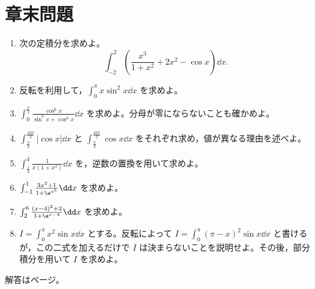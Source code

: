 \section*{章末問題}
\begin{enumerate}[label=\textbf{\thechapter.\arabic*},leftmargin=*]
\item\label{問:奇偶の混合}
次の定積分を求めよ。
\[
\int_{-2}^2\left(\frac{x^3}{1+x^2}+2x^2-\cos x\right)\dd x.
\]
\item\label{問:一次重み反転}
反転を利用して，$\int_0^\pi x\sin^2x\dd x$ を求めよ。
\item\label{問:三角相補}
$\int_0^{\frac{\pi}{2}}\frac{\cos^6x}{\sin^6x+\cos^6x}\dd x$ を求めよ。分母が零にならないことも確かめよ。
\item\label{問:周期絶対値}
$\int_{\frac{\pi}{3}}^{\frac{10\pi}{3}}|\cos x|\dd x$ と
$\int_{\frac{\pi}{3}}^{\frac{10\pi}{3}}\cos x\dd x$ をそれぞれ求め，値が異なる理由を述べよ。
\item\label{問:逆数四乗}
$\int_{\frac14}^{4}\frac{1}{x(1+x^4)}\dd x$ を，逆数の置換を用いて求めよ。
\item\label{問:指数相補}
$\int_{-1}^1\frac{3x^2+1}{1+\e^{x^5}}\dd x$ を求めよ。
\item\label{問:中心を移す相補}
$\int_2^6\frac{(x-4)^2+2}{1+\e^{x-4}}\dd x$ を求めよ。
\item\label{問:二次重みの限界}
$I=\int_0^\pi x^2\sin x\dd x$ とする。反転によって
$I=\int_0^\pi(\pi-x)^2\sin x\dd x$ と書けるが，この二式を加えるだけで $I$ は決まらないことを説明せよ。その後，部分積分を用いて $I$ を求めよ。
\end{enumerate}

\smallskip\noindent 解答は\pageref{解答:第7章}ページ。
